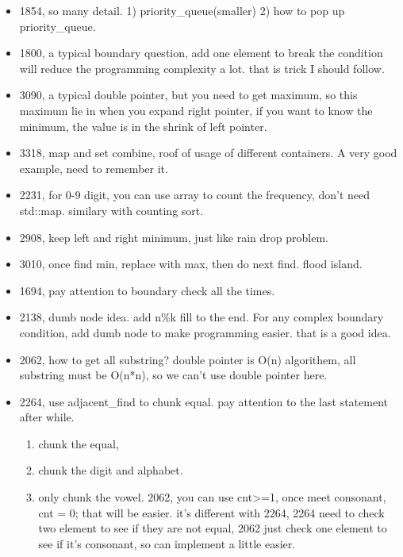 \documentclass[a4paper,11pt,twoside]{book}
\begin{document}
\begin{itemize}
	\item 1854, so many detail. 1) priority\_queue(smaller) 2) how to pop up priority\_queue. 
	
	\item 1800, a typical boundary question, add one element to break the condition will reduce the programming complexity a lot. that is trick I should follow. 
	
	
	\item 3090, a typical double pointer, but you need to get maximum, so this maximum lie in when you expand right pointer, if you want to know the minimum, the value is in the shrink of left pointer. 
	
	\item 3318, map and set combine, roof of usage of different containers.  A very good example, need to remember it. 
	
	\item 2231, for 0-9 digit, you can use array to count the frequency, don't need std::map. similary with counting sort. 
	
	\item 2908, keep left and right minimum, just like rain drop problem. 
	
	\item 3010, once find min, replace with max, then do next find. flood island. 
	
	\item 1694,  pay attention to boundary check all the times. 
	
	\item 2138, dumb node idea. add n\%k fill to the end. For any complex boundary condition, add dumb node to make programming easier. that is a good idea. 
	
	\item 2062, how to get all substring? double pointer is O(n) algorithem, all substring must be O(n*n), so we can't use double pointer here. 
	
	
	\item 2264, use adjacent\_find to chunk equal. pay attention to the last statement after while. 
	\begin{enumerate}
		\item chunk the equal, 
		\item chunk the digit and alphabet.
		\item only chunk the vowel. 2062, you can use cnt>=1, once meet consonant, cnt = 0; that will be easier. it's different with 2264, 2264 need to check two element to see if they are not equal, 2062 just check one element to see if it's consonant, so can implement a little easier. 
	\end{enumerate}
	

\end{itemize}
\end{document}

